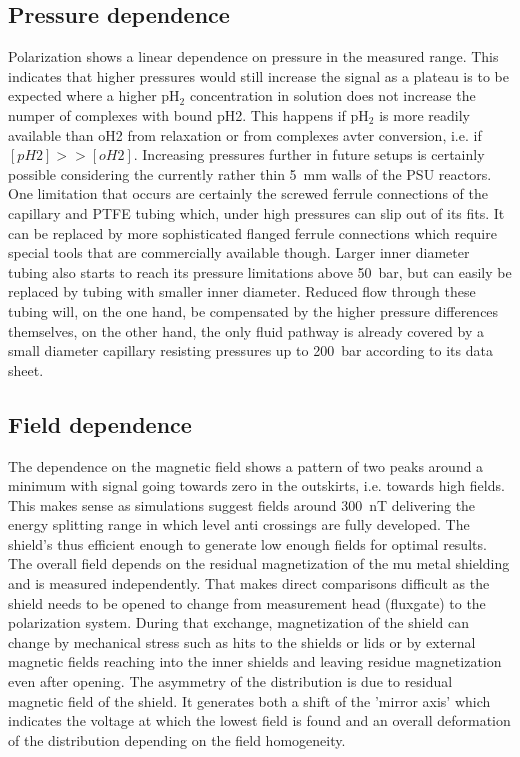         \subsection{Pressure dependence}
        Polarization shows a linear dependence on pressure in the measured range. This indicates that higher pressures would still increase the signal as a plateau is to be expected where a higher pH$_2$ concentration in solution does not increase the numper of complexes with bound pH2. This happens if pH$_2$ is more readily available than oH2 from relaxation or from complexes avter conversion, i.e. if $[pH2]>>[oH2]$. Increasing pressures further in future setups is certainly possible considering the currently rather thin \SI{5}{\mm} walls of the PSU reactors. One limitation that occurs are certainly the screwed ferrule connections of the capillary and PTFE tubing which, under high pressures can slip out of its fits. It can be replaced by more sophisticated flanged ferrule connections which require special tools that are commercially available though. Larger inner diameter tubing also starts to reach its pressure limitations above \SI{50}{\bar}, but can easily be replaced by tubing with smaller inner diameter. Reduced flow through these tubing will, on the one hand, be compensated by the higher pressure differences themselves, on the other hand, the only fluid pathway is already covered by a small diameter capillary resisting pressures up to \SI{200}{\bar} according to its data sheet.
        \subsection{Field dependence}
        The dependence on the magnetic field shows a pattern of two peaks around a minimum with signal going towards zero in the outskirts, i.e. towards high fields. This makes sense as simulations suggest fields around \SI{300}{\nano\tesla} delivering the energy splitting range in which level anti crossings are fully developed. The shield's thus efficient enough to generate low enough fields for optimal results. The overall field depends on the residual magnetization of the mu metal shielding and is measured independently. That makes direct comparisons difficult as the shield needs to be opened to change from measurement head (fluxgate) to the polarization system. During that exchange, magnetization of the shield can change by mechanical stress such as hits to the shields or lids or by external magnetic fields reaching into the inner shields and leaving residue magnetization even after opening. The asymmetry of the distribution is due to residual magnetic field of the shield. It generates both a shift of the 'mirror axis' which indicates the voltage at which the lowest field is found  and an overall deformation of the distribution depending on the field homogeneity.
